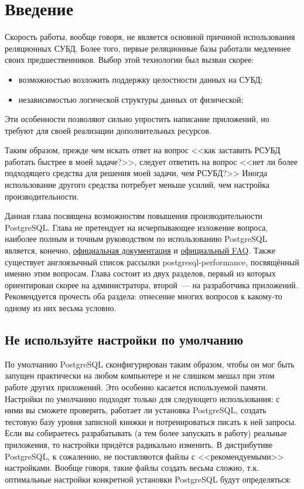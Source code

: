 \section{Введение}

Скорость работы, вообще говоря, не является основной причиной использования реляционных СУБД. Более того, первые реляционные базы работали медленнее своих предшественников. Выбор этой технологии был вызван скорее:

\begin{itemize}
  \item возможностью возложить поддержку целостности данных на СУБД;
  \item независимостью логической структуры данных от физической;
\end{itemize}

Эти особенности позволяют сильно упростить написание приложений, но требуют для своей реализации дополнительных ресурсов.

Таким образом, прежде чем искать ответ на вопрос <<как заставить РСУБД работать быстрее в моей задаче?>>, следует ответить на вопрос <<нет ли более подходящего средства для решения моей задачи, чем РСУБД?>> Иногда использование другого средства потребует меньше усилий, чем настройка производительности.

Данная глава посвящена возможностям повышения производительности PostgreSQL. Глава не претендует на исчерпывающее изложение вопроса, наиболее полным и точным руководством по использованию PostgreSQL является, конечно, \href{http://www.postgresql.org/docs/manuals/}{официальная документация} и \href{https://wiki.postgresql.org/wiki/Category:FAQ}{официальный FAQ}. Также существует англоязычный список рассылки postgresql-performance, посвящённый именно этим вопросам. Глава состоит из двух разделов, первый из которых ориентирован скорее на администратора, второй~--- на разработчика приложений. Рекомендуется прочесть оба раздела: отнесение многих вопросов к какому-то одному из них весьма условно.


\subsection{Не используйте настройки по умолчанию}

По умолчанию PostgreSQL сконфигурирован таким образом, чтобы он мог быть запущен практически на любом компьютере и не слишком мешал при этом работе других приложений. Это особенно касается используемой памяти. Настройки по умолчанию подходят только для следующего использования: с ними вы сможете проверить, работает ли установка PostgreSQL, создать тестовую базу уровня записной книжки и потренироваться писать к ней запросы. Если вы собираетесь разрабатывать (а тем более запускать в работу) реальные приложения, то настройки придётся радикально изменить. В дистрибутиве PostgreSQL, к сожалению, не поставляются файлы с <<рекомендуемыми>> настройками. Вообще говоря, такие файлы создать весьма сложно, т.к. оптимальные настройки конкретной установки PostgreSQL будут определяться:

